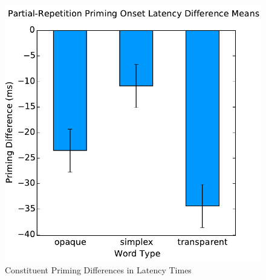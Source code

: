 \documentclass{frontiersSCNS}
\begin{document}
\begin{figure}
\begin{centering}
\includegraphics[scale=0.33]{images/latency_constituent_analysis}
\par\end{centering}
\caption{\label{fig:latency} Constituent Priming Differences in Latency Times}
\end{figure}
\end{document}
